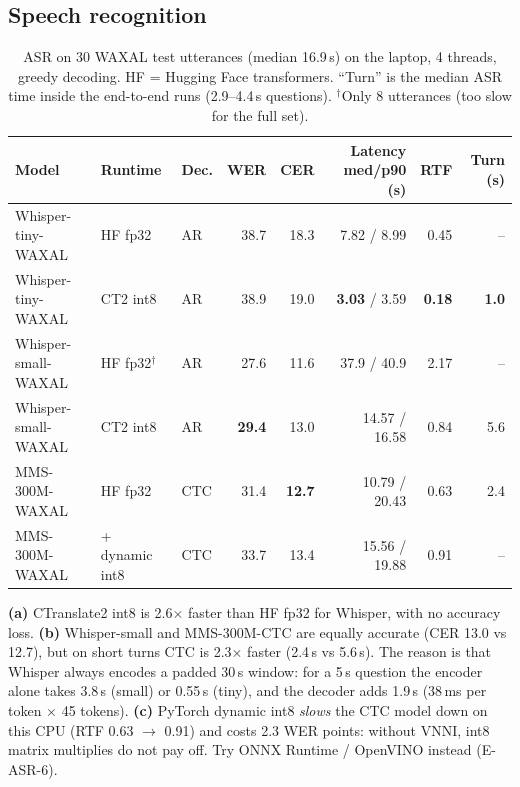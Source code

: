\subsection{Speech recognition}
\label{sec:m-asr}
\begin{table}[H]
\centering\footnotesize\setlength{\tabcolsep}{4pt}
\begin{tabular}{@{}lllrrrrr@{}}
\toprule
\textbf{Model} & \textbf{Runtime} & \textbf{Dec.} & \textbf{WER} & \textbf{CER} & \textbf{Latency med/p90 (s)} & \textbf{RTF} & \textbf{Turn (s)} \\
\midrule
Whisper-tiny-WAXAL & HF fp32 & AR & 38.7 & 18.3 & 7.82 / 8.99 & 0.45 & -- \\
Whisper-tiny-WAXAL & CT2 int8 & AR & 38.9 & 19.0 & \textbf{3.03} / 3.59 & \textbf{0.18} & \textbf{1.0} \\
Whisper-small-WAXAL & HF fp32$^\dagger$ & AR & 27.6 & 11.6 & 37.9 / 40.9 & 2.17 & -- \\
Whisper-small-WAXAL & CT2 int8 & AR & \textbf{29.4} & 13.0 & 14.57 / 16.58 & 0.84 & 5.6 \\
MMS-300M-WAXAL & HF fp32 & CTC & 31.4 & \textbf{12.7} & 10.79 / 20.43 & 0.63 & 2.4 \\
MMS-300M-WAXAL & + dynamic int8 & CTC & 33.7 & 13.4 & 15.56 / 19.88 & 0.91 & -- \\
\bottomrule
\end{tabular}
\caption{ASR on 30 WAXAL test utterances (median 16.9\,s) on the laptop, 4 threads, greedy decoding\meas.
HF = Hugging Face transformers. ``Turn'' is the median ASR time inside the end-to-end runs (2.9--4.4\,s questions).
$^\dagger$Only 8 utterances (too slow for the full set).}
\label{tab:asr-meas}
\end{table}

\begin{finding}
\textbf{(a)} CTranslate2 int8 is 2.6$\times$ faster than HF fp32 for Whisper, with no accuracy loss.
\textbf{(b)} Whisper-small and MMS-300M-CTC are equally accurate (CER 13.0 vs 12.7), but on short turns
CTC is 2.3$\times$ faster (2.4\,s vs 5.6\,s). The reason is that Whisper always encodes a padded 30\,s
window: for a 5\,s question the encoder alone takes 3.8\,s (small) or 0.55\,s (tiny), and the decoder adds
1.9\,s (38\,ms per token $\times$ 45 tokens)\meas. \textbf{(c)} PyTorch dynamic int8 \emph{slows} the CTC
model down on this CPU (RTF 0.63 $\rightarrow$ 0.91) and costs 2.3 WER points: without VNNI, int8
matrix multiplies do not pay off. Try ONNX Runtime / OpenVINO instead (E-ASR-6).
\end{finding}

